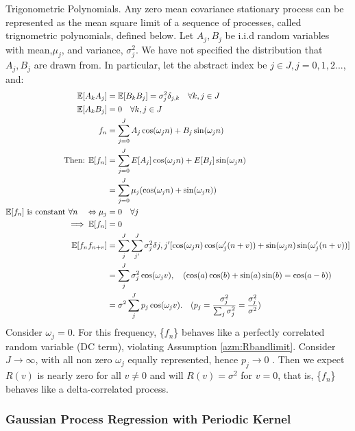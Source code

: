 \begin{defn} \label{sec:ap_ssp_tp} Trigonometric Polynomials.  Any zero mean covariance stationary process can be represented as the mean square limit of a sequence of processes, called trignometric polynomials, defined below. Let $A_j, B_j$ be i.i.d random variables with mean,$\mu_j$, and variance, $\sigma_j^2$. We have not specified the distribution that $A_j, B_j$ are drawn from. In particular, let the abstract index be $j \in J, j = 0,1,2... $, and:
\begin{align}
\mathbb{E}[A_k A_j] &= \mathbb{E}[B_k B_j] = \sigma_j^2 \delta_{j,k} \quad \forall k,j \in J\\
\mathbb{E}[A_k B_j] &= 0 \quad  \forall k,j \in J \label{eqn:karlin_trig_cross} \\
f_n &= \sum_{j=0}^{J} A_j \cos(\omega_j n) + B_j \sin(\omega_j n) \label{eqn:E_f_trigpolynomial} \\
\text{Then: }\mathbb{E}[f_n] &=  \sum_{j=0}^{J} E[A_j] \cos(\omega_j n) + E[B_j] \sin(\omega_j n) \\
& =  \sum_{j=0}^{J}  \mu_j(\cos(\omega_j n) + \sin(\omega_j n)) \\
\text{$\mathbb{E}[f_n]$ is constant $\forall n$} \quad \Leftrightarrow \mu_j &=0  \quad \forall j\\
\implies \mathbb{E}[f_n] &=  0 \\
\mathbb{E}[f_n f_{n+v}] &= \sum_j^{J} \sum_{j'}^{J} \sigma_j^2\delta{j,j'} [\cos(\omega_j n)\cos(\omega_j' (n+v)) + \sin(\omega_j n)\sin(\omega_j' (n+v)) ]\\
&= \sum_j^{J} \sigma_j^2 \cos(\omega_jv), \quad \text{$(\cos(a)\cos(b) + \sin(a)\sin(b) = \cos(a-b))$} \\
&= \sigma^2 \sum_j^{J}  p_j \cos(\omega_jv). \quad \text{$(p_j = \frac{\sigma_j^2}{\sum_j \sigma_j^2} = \frac{\sigma_j^2}{\sigma^2})$}
\end{align}
Consider $\omega_j =0$. For this frequency, \{$f_n$\} behaves like a perfectly correlated random variable (DC term), violating Assumption \ref{azm:Rbandlimit}. Consider $J \to \infty$, with all non zero $\omega_j$ equally represented, hence $p_j \to 0$ . Then we expect $R(v)$ is nearly zero for all $v\neq 0$ and will $R(v)=\sigma^2$ for $v=0$, that is, \{$f_n$\} behaves like a delta-correlated process. 
\end{defn}


\subsubsection{Gaussian Process Regression with Periodic Kernel} \label{sec:ap_approxSP:GPRPKernel}

